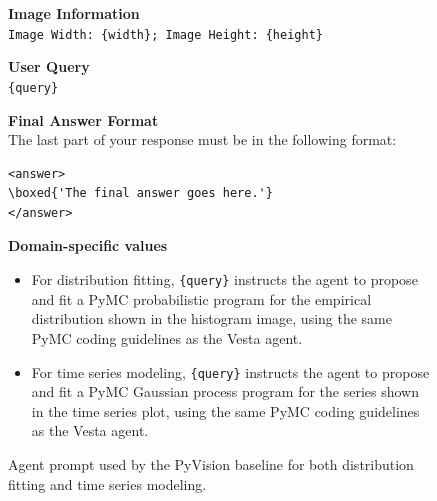 \documentclass{article}
\newcommand{\method}{{\sc Vesta}}
\newcommand{\highlight}[1]{{\color{magenta}\{\{#1\}\}}}
\newcommand{\promptsubsection}[1]{
\setlength{\parskip}{6pt} \noindent\textbf{{#1}:}
}
\begin{document}
\begin{figure}[h]
\begin{mdframed}[linecolor=gray!50, backgroundcolor=gray!5, linewidth=0.8pt]
\medskip
\textbf{Image Information}\\
\texttt{Image Width: \{width\}; Image Height: \{height\}}

\medskip
\textbf{User Query}\\
\texttt{\{query\}}

\medskip
\textbf{Final Answer Format}\\
The last part of your response must be in the following format:

\begin{verbatim}
<answer>
\boxed{'The final answer goes here.'}
</answer>
\end{verbatim}

\medskip
\textbf{Domain-specific values}
\begin{itemize}[leftmargin=*, nosep]
    \item For distribution fitting, \texttt{\{query\}} instructs the agent
          to propose and fit a PyMC probabilistic program for the
          empirical distribution shown in the histogram image, using the
          same PyMC coding guidelines as the \method{} agent.
    \item For time series modeling, \texttt{\{query\}} instructs the agent
          to propose and fit a PyMC Gaussian process program for the
          series shown in the time series plot, using the same PyMC
          coding guidelines as the \method{} agent.
\end{itemize}

\end{mdframed}
\caption{Agent prompt used by the PyVision baseline for both distribution fitting and time series modeling.}
\label{fig:pyvision-agent-prompt}
\end{figure}






\end{document}
